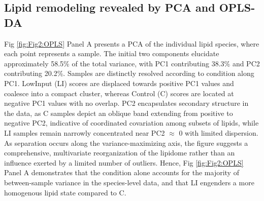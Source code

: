 \documentclass[10pt,letterpaper]{article}
\begin{document}
\subsection*{Lipid remodeling revealed by PCA and OPLS-DA}

Fig \ref{fig:Fig2:OPLS} Panel A presents a PCA of the individual lipid species, where each point represents a sample. The initial two components elucidate approximately 58.5\% of the total variance, with PC1 contributing 38.3\% and PC2 contributing 20.2\%. Samples are distinctly resolved according to condition along PC1. LowInput (LI) scores are displaced towards positive PC1 values and coalesce into a compact cluster, whereas Control (C) scores are located at negative PC1 values with no overlap. PC2 encapsulates secondary structure in the data, as C samples depict an oblique band extending from positive to negative PC2, indicative of coordinated covariation among subsets of lipids, while LI samples remain narrowly concentrated near PC2 $\approx$ 0 with limited dispersion. As separation occurs along the variance-maximizing axis, the figure suggests a comprehensive, multivariate reorganization of the lipidome rather than an influence exerted by a limited number of outliers. Hence, Fig \ref{fig:Fig2:OPLS} Panel A demonstrates that the condition alone accounts for the majority of between-sample variance in the species-level data, and that LI engenders a more homogenous lipid state compared to C.
\end{document}
